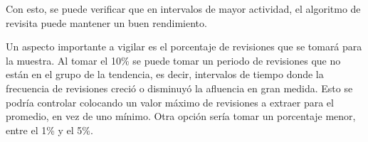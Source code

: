 Con esto, se puede verificar que en intervalos de mayor actividad, el algoritmo de revisita puede mantener un buen rendimiento.

Un aspecto importante a vigilar es el porcentaje de revisiones que se tomará para la muestra.
Al tomar el 10\% se puede tomar un periodo de revisiones que no están en el grupo de la tendencia, es decir, intervalos de tiempo donde la frecuencia de revisiones creció o disminuyó la afluencia en gran medida.
Esto se podría controlar colocando un valor máximo de revisiones a extraer para el promedio, en vez de uno mínimo.
Otra opción sería tomar un porcentaje menor, entre el 1\% y el 5\%.
